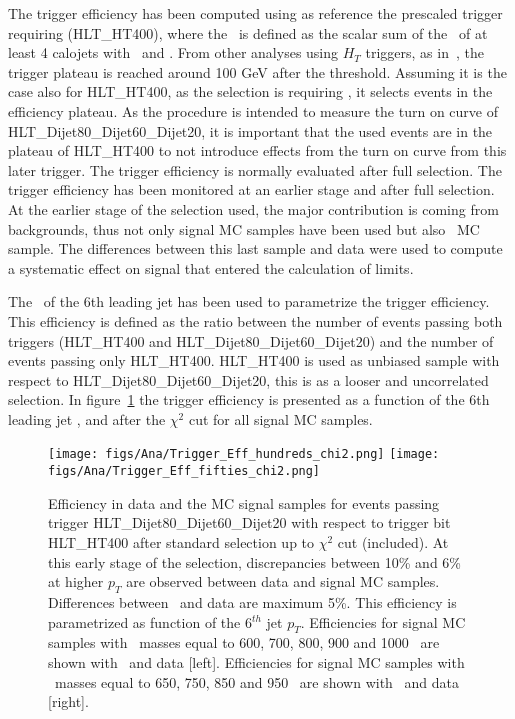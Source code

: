 The trigger efficiency has been computed using as reference the prescaled trigger requiring  (HLT\_HT400), where the \HT~is defined as the scalar sum of the \pt~of at least 4 calojets with ~and . From other analyses using $H_{T}$ triggers, as in~\cite{Khachatryan:2015axa}, the trigger plateau is reached around 100 GeV after the threshold. Assuming it is the case also for HLT\_HT400, as the selection is requiring , it selects events in the efficiency plateau. As the procedure is intended to measure the turn on curve of HLT\_Dijet80\_Dijet60\_Dijet20, it is important that the used events are in the plateau of HLT\_HT400 to not introduce effects from the turn on curve from this later trigger. The trigger efficiency is normally evaluated after full selection. The trigger efficiency has been monitored at an earlier stage and after full selection. At the earlier stage of the selection used, the major contribution is coming from backgrounds, thus not only signal MC samples have been used but also \ttbar~MC sample. The differences between this last sample and data were used to compute a systematic effect on signal that entered the calculation of limits.

The \pt~of the 6th leading jet has been used to parametrize the trigger efficiency. This efficiency is defined as the ratio between the number of events passing both triggers (HLT\_HT400 and HLT\_Dijet80\_Dijet60\_Dijet20) and the number of events passing only HLT\_HT400. HLT\_HT400 is used as unbiased sample with respect to HLT\_Dijet80\_Dijet60\_Dijet20, this is as a looser and uncorrelated selection. In figure~\ref{fig:TrigEff} the trigger efficiency is presented as a function of the 6th leading jet \pt, and after the $\chi^{2}$ cut for all signal MC samples. 

\begin{figure}[!Hhtbp]
  \begin{center}
    \texttt{[image: figs/Ana/Trigger\_Eff\_hundreds\_chi2.png]}
    \texttt{[image: figs/Ana/Trigger\_Eff\_fifties\_chi2.png]}
    \caption{Efficiency in data and the MC signal samples for events passing trigger HLT\_Dijet80\_Dijet60\_Dijet20 with respect to trigger bit HLT\_HT400 after standard selection up to $\chi^{2}$ cut (included). At this early stage of the selection, discrepancies between 10\% and 6\% at higher $p_{T}$ are observed between data and signal MC samples. Differences between \ttbar~and data are maximum 5\%. This efficiency is parametrized as function of the 6$^{th}$ jet $p_{T}$. Efficiencies for signal MC samples with \Tp~masses equal to 600, 700, 800, 900 and 1000 \GeVcc~are shown with \ttbar~and data [left]. Efficiencies for signal MC samples with \Tp~masses equal to 650, 750, 850 and 950 \GeVcc~are shown with \ttbar~and data [right].}
    \label{fig:TrigEff}
  \end{center}
\end{figure}

